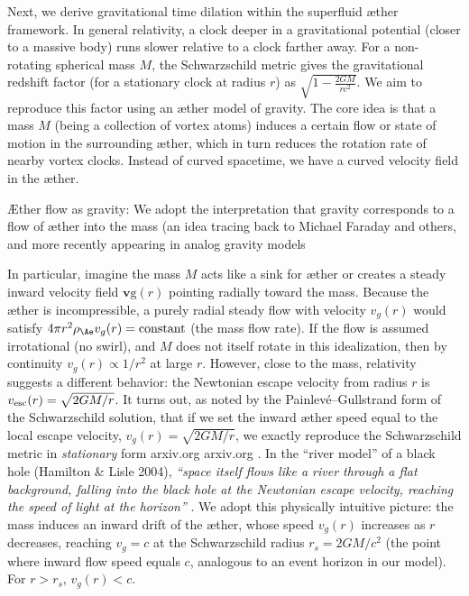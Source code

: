 \documentclass[aps,preprint,superscriptaddress]{revtex4}
\begin{document}
Next, we derive gravitational time dilation within the superfluid æther framework. In general relativity, a clock deeper in a gravitational potential (closer to a massive body) runs slower relative to a clock farther away. For a non-rotating spherical mass $M$, the Schwarzschild metric gives the gravitational redshift factor (for a stationary clock at radius $r$) as $\sqrt{1-\frac{2GM}{r c^2}}$. We aim to reproduce this factor using an æther model of gravity. The core idea is that a mass $M$ (being a collection of vortex atoms) induces a certain flow or state of motion in the surrounding æther, which in turn reduces the rotation rate of nearby vortex clocks. Instead of curved spacetime, we have a curved velocity field in the æther.


Æther flow as gravity: We adopt the interpretation that gravity corresponds to a flow of æther into the mass (an idea tracing back to Michael Faraday and others, and more recently appearing in analog gravity models


In particular, imagine the mass $M$ acts like a sink for æther or creates a steady inward velocity field $\mathbf{v}\text{g}(r)$ pointing radially toward the mass. Because the æther is incompressible, a purely radial steady flow with velocity $v_g(r)$ would satisfy $4\pi r^2 \rho_{\Ae} v_g(r) = \text{constant}$ (the mass flow rate). If the flow is assumed irrotational (no swirl), and $M$ does not itself rotate in this idealization, then by continuity $v_g(r) \propto 1/r^2$ at large $r$. However, close to the mass, relativity suggests a different behavior: the Newtonian escape velocity from radius $r$ is $v_{\rm esc}(r) = \sqrt{2GM/r}$. It turns out, as noted by the Painlevé–Gullstrand form of the Schwarzschild solution, that if we set the inward æther speed equal to the local escape velocity, $v_g(r)=\sqrt{2GM/r}$, we exactly reproduce the Schwarzschild metric in \textit{stationary} form arxiv.org
 arxiv.org
. In the “river model” of a black hole (Hamilton & Lisle 2004), \textit{“space itself flows like a river through a flat background, falling into the black hole at the Newtonian escape velocity, reaching the speed of light at the horizon”}
. We adopt this physically intuitive picture: the mass induces an inward drift of the æther, whose speed $v_g(r)$ increases as $r$ decreases, reaching $v_g = c$ at the Schwarzschild radius $r_s = 2GM/c^2$ (the point where inward flow speed equals $c$, analogous to an event horizon in our model). For $r > r_s$, $v_g(r) < c$.
\end{document}
